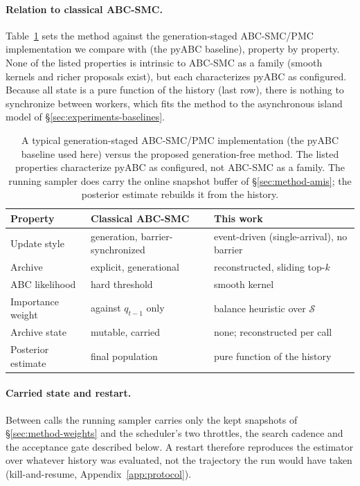 \documentclass[10pt]{article}
\theoremstyle{plain}
\theoremstyle{definition}
\begin{document}
\paragraph{Relation to classical ABC-SMC.}\label{sec:method-comparison}
Table~\ref{tab:method-comparison} sets the method against the generation-staged ABC-SMC/PMC implementation we compare with (the pyABC baseline), property by property. None of the listed properties is intrinsic to ABC-SMC as a family (smooth kernels and richer proposals exist), but each characterizes pyABC as configured. Because all state is a pure function of the history (last row), there is nothing to synchronize between workers, which fits the method to the asynchronous island model of \S\ref{sec:experiments-baselines}.
\begin{table}[h]
\caption{A typical generation-staged ABC-SMC/PMC implementation (the pyABC baseline used here) versus the proposed generation-free method. The listed properties characterize pyABC as configured, not ABC-SMC as a family. The running sampler does carry the online snapshot buffer of \S\ref{sec:method-amis}; the posterior estimate rebuilds it from the history.}\label{tab:method-comparison}
\centering
\begin{tabular}{@{}lll@{}}
\toprule
Property & Classical ABC-SMC & This work \\
\midrule
Update style & generation, barrier-synchronized & event-driven (single-arrival), no barrier \\
Archive & explicit, generational & reconstructed, sliding top-$k$ \\
ABC likelihood & hard threshold & smooth kernel \\
Importance weight & against $q_{t-1}$ only & balance heuristic over $\mathcal{S}$ \\
Archive state & mutable, carried & none; reconstructed per call \\
Posterior estimate & final population & pure function of the history \\
\bottomrule
\end{tabular}
\end{table}

\paragraph{Carried state and restart.} Between calls the running sampler carries only the kept snapshots of \S\ref{sec:method-weights} and the scheduler's two throttles, the search cadence and the acceptance gate described below. A restart therefore reproduces the estimator over whatever history was evaluated, not the trajectory the run would have taken (kill-and-resume, Appendix~\ref{app:protocol}).
\end{document}
